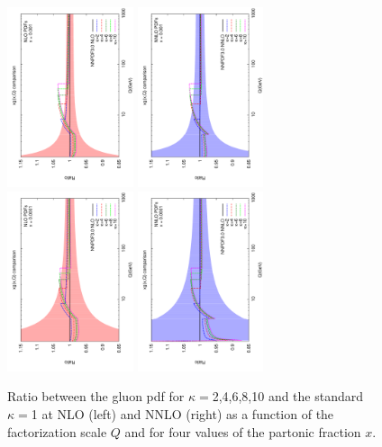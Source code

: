 \documentclass[letter,11pt]{article}
\def\k{\kappa}
\begin{document}
\begin{figure}[t]
\includegraphics[width=0.33\textwidth,angle=-90]{./gluon_ratio_kb_nlo_x_0001.pdf}
\includegraphics[width=0.33\textwidth,angle=-90]{./gluon_ratio_kb_nnlo_x_0001.pdf}
\includegraphics[width=0.33\textwidth,angle=-90]{./gluon_ratio_kb_nlo_x_00001.pdf}
\includegraphics[width=0.33\textwidth,angle=-90]{./gluon_ratio_kb_nnlo_x_00001.pdf}
\caption{Ratio between the gluon pdf for $\k=$2,4,6,8,10 and the standard $\k=$1 at NLO (left) and NNLO (right) as a function of the factorization scale $Q$ and for four values of the partonic fraction $x$.}
\label{fig:gluonpdf}
\end{figure}
\end{document}
